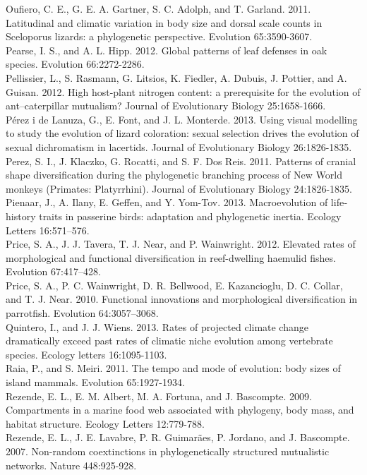 \documentclass[a4paper,12pt]{article}
\begin{document}
Oufiero, C. E., G. E. A. Gartner, S. C. Adolph, and T. Garland. 2011. Latitudinal and climatic variation in body size and dorsal scale counts in Sceloporus lizards: a phylogenetic perspective. Evolution 65:3590-3607.\\
Pearse, I. S., and A. L. Hipp. 2012. Global patterns of leaf defenses in oak species. Evolution 66:2272-2286.\\
Pellissier, L., S. Rasmann, G. Litsios, K. Fiedler, A. Dubuis, J. Pottier, and A. Guisan. 2012. High host-plant nitrogen content: a prerequisite for the evolution of ant–caterpillar mutualism? Journal of Evolutionary Biology 25:1658-1666.\\
P\'{e}rez i de Lanuza, G., E. Font, and J. L. Monterde. 2013. Using visual modelling to study the evolution of lizard coloration: sexual selection drives the evolution of sexual dichromatism in lacertids. Journal of Evolutionary Biology 26:1826-1835.\\
Perez, S. I., J. Klaczko, G. Rocatti, and S. F. Dos Reis. 2011. Patterns of cranial shape diversification during the phylogenetic branching process of New World monkeys (Primates: Platyrrhini). Journal of Evolutionary Biology 24:1826-1835.\\
Pienaar, J., A. Ilany, E. Geffen, and Y. Yom-Tov. 2013. Macroevolution of life‐history traits in passerine birds: adaptation and phylogenetic inertia. Ecology Letters 16:571–576.\\
Price, S. A., J. J. Tavera, T. J. Near, and P. Wainwright. 2012. Elevated rates of morphological and functional diversification in reef-dwelling haemulid fishes. Evolution 67:417–428.\\
Price, S. A., P. C. Wainwright, D. R. Bellwood, E. Kazancioglu, D. C. Collar, and T. J. Near. 2010. Functional innovations and morphological diversification in parrotfish. Evolution 64:3057–3068.\\
Quintero, I., and J. J. Wiens. 2013. Rates of projected climate change dramatically exceed past rates of climatic niche evolution among vertebrate species. Ecology letters 16:1095-1103.\\
Raia, P., and S. Meiri. 2011. The tempo and mode of evolution: body sizes of island mammals. Evolution 65:1927-1934.\\
Rezende, E. L., E. M. Albert, M. A. Fortuna, and J. Bascompte. 2009. Compartments in a marine food web associated with phylogeny, body mass, and habitat structure. Ecology Letters 12:779-788.\\
Rezende, E. L., J. E. Lavabre, P. R. Guimarães, P. Jordano, and J. Bascompte. 2007. Non-random coextinctions in phylogenetically structured mutualistic networks. Nature 448:925-928.\\
\end{document}

